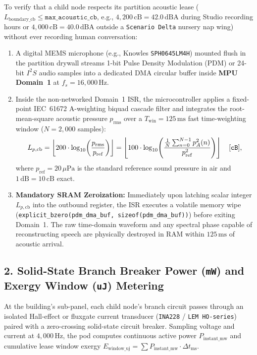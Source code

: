 To verify that a child node respects its partition acoustic lease ($L_{\mathrm{boundary\_cb}} \le \mathtt{max\_acoustic\_cb}$, e.g., $4{,}200\,\mathrm{cB} = 42.0\,\mathrm{dBA}$ during Studio recording hours or $4{,}000\,\mathrm{cB} = 40.0\,\mathrm{dBA}$ outside a \texttt{Scenario Delta} nursery nap wing) without ever recording human conversation:
\begin{enumerate}
    \item A digital MEMS microphone (e.g., Knowles \texttt{SPH0645LM4H}) mounted flush in the partition drywall streams 1-bit Pulse Density Modulation (PDM) or 24-bit $I^2S$ audio samples into a dedicated DMA circular buffer inside \textbf{MPU Domain~1} at $f_s = 16{,}000\,\mathrm{Hz}$.
    \item Inside the non-networked Domain~1 ISR, the microcontroller applies a fixed-point IEC~61672 A-weighting biquad cascade filter and integrates the root-mean-square acoustic pressure $p_{\mathrm{rms}}$ over a $T_{\mathrm{win}} = 125\,\mathrm{ms}$ fast time-weighting window ($N = 2{,}000$ samples):
    \begin{equation}
        L_{p,\mathrm{cb}} = \left\lfloor 200 \cdot \log_{10}\!\left(\frac{p_{\mathrm{rms}}}{p_{\mathrm{ref}}}\right) \right\rfloor = \left\lfloor 100 \cdot \log_{10}\!\left(\frac{\frac{1}{N}\sum_{n=0}^{N-1} p_A^2(n)}{p_{\mathrm{ref}}^2}\right) \right\rfloor \quad [\text{\texttt{cB}}],
        \label{eq:l2-centibel-spl}
    \end{equation}
    where $p_{\mathrm{ref}} = 20\,\mu\mathrm{Pa}$ is the standard reference sound pressure in air and $1\,\mathrm{dB} = 10\,\mathrm{cB}$ exact.
    \item \textbf{Mandatory SRAM Zeroization:} Immediately upon latching scalar integer $L_{p,\mathrm{cb}}$ into the outbound register, the ISR executes a volatile memory wipe (\texttt{explicit\_bzero(pdm\_dma\_buf, sizeof(pdm\_dma\_buf))}) before exiting Domain~1. The raw time-domain waveform and any spectral phase capable of reconstructing speech are physically destroyed in RAM within $125\,\mathrm{ms}$ of acoustic arrival.
\end{enumerate}

\subsection{2. Solid-State Branch Breaker Power (\texttt{mW}) and Exergy Window (\texttt{uJ}) Metering}

At the building's sub-panel, each child node's branch circuit passes through an isolated Hall-effect or fluxgate current transducer (\texttt{INA228} / \texttt{LEM HO-series}) paired with a zero-crossing solid-state circuit breaker. Sampling voltage and current at $4{,}000\,\mathrm{Hz}$, the pod computes continuous active power $P_{\mathrm{instant\_mw}}$ and cumulative lease window exergy $E_{\mathrm{window\_uj}} = \sum P_{\mathrm{instant\_mw}} \cdot \Delta t_{\mathrm{ms}}$.

